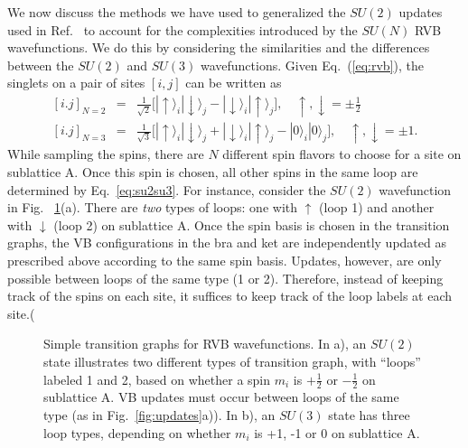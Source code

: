 \documentclass[11pt]{iopart}
\begin{document}
We now discuss the methods we have used to generalized the $SU(2)$ updates used in Ref.~\cite{RVB2,Ju2012} to account for the complexities introduced by the $SU(N)$ RVB wavefunctions.
We do this by considering the similarities and the differences between the $SU(2)$ and $SU(3)$ wavefunctions.
Given Eq.\ (\ref{eq:rvb}), the singlets on a pair of sites $[i,j]$ can be written as
%
\begin{eqnarray}
\left[i.j\right]_{N=2} &=& \frac{1}{\sqrt{2}} \big[ | \uparrow \rangle_i | \downarrow \rangle_j - | \downarrow \rangle_i | \uparrow \rangle_j \big] , \quad \uparrow,\downarrow = \pm \frac{1}{2}\\
\left[i.j\right]_{N=3} &=& \frac{1}{\sqrt{3}} \big[ | \uparrow \rangle_i | \downarrow \rangle_j + | \downarrow \rangle_i | \uparrow \rangle_j - |0\rangle_i |0\rangle_j \big] , \quad \uparrow,\downarrow = \pm 1.
\label{eq:su2su3}
\end{eqnarray}
%
While sampling the spins, there are $N$ different spin flavors to choose for a site on sublattice A.
Once this spin is chosen, all other spins in the same loop are determined by Eq.~\ref{eq:su2su3}.
For instance, consider the $SU(2)$ wavefunction in Fig. ~\ref{fig:su2su3graphs}(a).
There are \textit{two} types of loops: one with $\uparrow$ (loop 1) and another with $\downarrow$ (loop 2) on sublattice A.
Once the spin basis is chosen in the transition graphs, the VB configurations in the bra and ket are independently updated as prescribed above according to the same spin basis.
Updates, however, are only possible between loops of the same type (1 or 2).
Therefore, instead of keeping track of the spins on each site, it suffices to keep track of the loop labels at each site.(
%
\begin{figure}[t]
 \begin{center}
 \end{center}
 \caption{Simple transition graphs for RVB wavefunctions.  In a), an $SU(2)$ state illustrates two different types of transition graph, with ``loops'' labeled 1 and 2, based on whether a spin $m_i$ is $+\frac{1}{2}$ or $-\frac{1}{2}$ on sublattice A.  VB updates must occur between loops of the same type (as in Fig.~\ref{fig:updates}a)).  In b), an $SU(3)$ state has three loop types, depending on whether $m_i$ is +1, -1 or 0 on sublattice A.
 \label{fig:su2su3graphs} }
 \end{figure}
\end{document}
